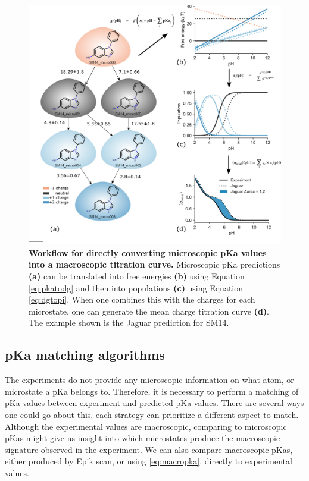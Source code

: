\documentclass[9pt,lineno,final]{elife}
\begin{document}
\begin{figure}
\centering
\includegraphics[width=\textwidth]{micropka-workflow.pdf}
\caption{{\bf Workflow for directly converting microscopic pKa values into a macroscopic titration curve.} Microscopic pKa predictions {\bf(a)} can be translated into free energies {\bf(b)} using Equation \ref{eq:pkatodg} and then into populations {\bf(c)} using Equation \ref{eq:dgtopi}. When one combines this with the charges for each microstate, one can generate the mean charge titration curve {\bf(d)}. The example shown is the Jaguar prediction for SM14.
	\label{fig:sm14-prediction}}
\end{figure}


\subsection{pKa matching algorithms}
The experiments do not provide any microscopic information on what atom, or microstate a pKa belongs to.
%
Therefore, it is necessary to perform a matching of pKa values between experiment and predicted pKa values.
%
There are several ways one could go about this, each strategy can prioritize a different aspect to match.
%
Although the experimental values are macroscopic, comparing to microscopic pKas might give us insight into which microstates produce the macroscopic signature observed in the experiment.
%
We can also compare macroscopic pKas, either produced by Epik scan, or using \cref{eq:macropka}, directly to experimental values.
%
\end{document}
